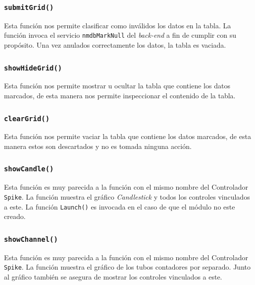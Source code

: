 		\subsubsection{\texttt{submitGrid()}}
			Esta función nos permite clasificar como inválidos los datos en la tabla. La función invoca el servicio \texttt{nmdbMarkNull}
			del \emph{back-end} a fin de cumplir con su propósito. Una vez anulados correctamente los datos, la tabla es vaciada.
		\subsubsection{\texttt{showHideGrid()}}
			Esta función nos permite mostrar u ocultar la tabla que contiene los datos marcados, de esta manera nos permite inspeccionar
			el contenido de la tabla.
		\subsubsection{\texttt{clearGrid()}}
			Esta función nos permite vaciar la tabla que contiene los datos marcados, de esta manera estos son descartados y no es tomada
			ninguna acción.
		\subsubsection{\texttt{showCandle()}}
			Esta función es muy parecida a la función con el mismo nombre del Controlador \texttt{Spike}. La función muestra el gráfico
			\emph{Candlestick} y todos los controles vinculados a este. La función \texttt{Launch()} es invocada en el caso de que el módulo
			no este creado.
		\subsubsection{\texttt{showChannel()}}
			Esta función es muy parecida a la función con el mismo nombre del Controlador \texttt{Spike}. La función muestra el gráfico de
			los tubos contadores por separado. Junto al gráfico también se asegura de mostrar los controles vinculados a este.		
